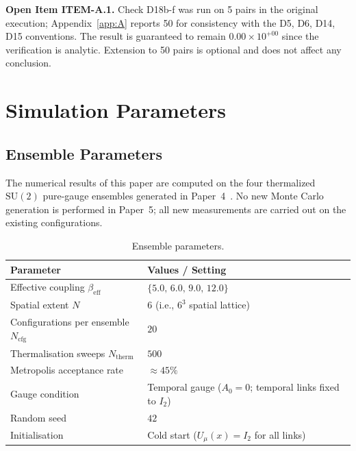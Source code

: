 \documentclass[12pt]{article}
\numberwithin{equation}{section}
\theoremstyle{plain}
\theoremstyle{definition}
\theoremstyle{remark}
\newcommand{\su}{\mathrm{SU}}              %
\begin{document}
		\medskip\noindent
		\textbf{Open Item ITEM-A.1.}\enspace
		Check D18b-f was run on 5 pairs in the original execution;
		Appendix~\ref{app:A} reports 50 for consistency with the D5, D6,
		D14, D15 conventions.  The result is guaranteed to remain
		$0.00\times 10^{+00}$ since the verification is analytic.  Extension
		to 50 pairs is optional and does not affect any conclusion.
		
		\section{Simulation Parameters}
		\label{app:B}
		
		\subsection{Ensemble Parameters}
		\label{sec:ensemble-params}
		
		The numerical results of this paper are computed on the four
		thermalized $\su(2)$ pure-gauge ensembles generated in
		Paper~4~\cite{FirestoneP4}.  No new Monte Carlo generation is
		performed in Paper~5; all new measurements are carried out on the
		existing configurations.
		
		\begin{table}[ht]
			\centering
			\caption{Ensemble parameters.}
			\label{tab:ensemble-params}
			\small
			\setlength{\tabcolsep}{8pt}
			\begin{tabular}{@{}lp{8cm}@{}}
				\toprule
				\textbf{Parameter} & \textbf{Values / Setting}\\
				\midrule
				Effective coupling $\beta_{\mathrm{eff}}$
				& $\{5.0,\,6.0,\,9.0,\,12.0\}$\\
				Spatial extent $N$
				& $6$ (i.e., $6^{3}$ spatial lattice)\\
				Configurations per ensemble $N_{\mathrm{cfg}}$
				& $20$\\
				Thermalisation sweeps $N_{\mathrm{therm}}$
				& $500$\\
				Metropolis acceptance rate
				& $\approx 45\%$\\
				Gauge condition
				& Temporal gauge ($A_0 = 0$; temporal links fixed to $I_2$)\\
				Random seed
				& $42$\\
				Initialisation
				& Cold start ($U_\mu(x) = I_2$ for all links)\\
				\bottomrule
			\end{tabular}
		\end{table}
		
\end{document}
